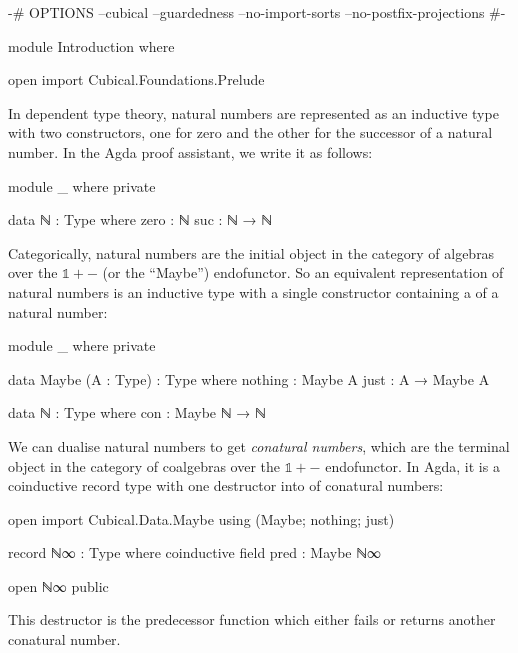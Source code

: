 \begin{code}[hide]
{-# OPTIONS --cubical --guardedness --no-import-sorts --no-postfix-projections #-}

module Introduction where

open import Cubical.Foundations.Prelude
\end{code}
In dependent type theory, natural numbers are represented as an inductive type
with two constructors, one for zero and the other for the successor of a natural
number. In the Agda proof assistant, we write it as follows:
\begin{code}[hide]
module _ where private
\end{code}
\begin{code}
  data ℕ : Type where
    zero  :      ℕ
    suc   : ℕ →  ℕ
\end{code}
Categorically, natural numbers are the initial object in the category of
algebras over the $\mathbb{1} + {-}$ (or the ``Maybe'') endofunctor. So an
equivalent representation of natural numbers is an inductive type with a single
constructor containing a  of a natural number:
\begin{code}[hide]
module _ where private
\end{code}
\begin{code}
  data Maybe (A : Type) : Type where
    nothing  :      Maybe A
    just     : A →  Maybe A

  data ℕ : Type where
    con : Maybe ℕ → ℕ
\end{code}

We can dualise natural numbers to get \emph{conatural numbers}, which are the
terminal object in the category of coalgebras over the $\mathbb{1} + {-}$
endofunctor. In Agda, it is a coinductive record type with one destructor into
 of conatural numbers:
\begin{code}[hide]
open import Cubical.Data.Maybe using (Maybe; nothing; just)
\end{code}
\begin{code}
record ℕ∞ : Type where
  coinductive
  field
    pred : Maybe ℕ∞
\end{code}
\begin{code}[hide]
open ℕ∞ public
\end{code}
This destructor is the predecessor function which either fails or returns
another conatural number.

